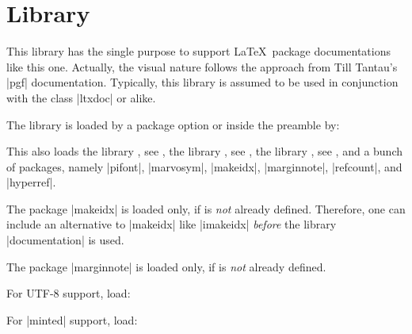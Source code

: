 \clearpage
\section{Library }\label{sec:documentation}%
%
This library has the single purpose to support \LaTeX\ package documentations
like this one. Actually, the visual nature follows the approach from
Till Tantau's |pgf| \cite{tantau:2015a} documentation.
Typically, this library is assumed to be used in conjunction with the
class |ltxdoc| or alike.

The library is loaded by a package option or inside the preamble by:
\begin{dispListing}
\end{dispListing}
This also loads the library , see ,
the library , see ,
the library , see ,
and a bunch of packages, namely
|pifont|, |marvosym|, |makeidx|, |marginnote|, |refcount|, and |hyperref|.

\begin{marker}
The package |makeidx| is loaded only, if  is
\emph{not} already defined. Therefore, one can include an alternative to |makeidx| like
|imakeidx| \emph{before} the library |documentation| is used.
\end{marker}
\begin{marker}
The package |marginnote| is loaded only, if  is
\emph{not} already defined.
\end{marker}

For UTF-8 support, load:
\begin{dispListing}
\end{dispListing}

For |minted| \cite{poore:2015a} support, load:
\begin{dispListing}
\end{dispListing}



